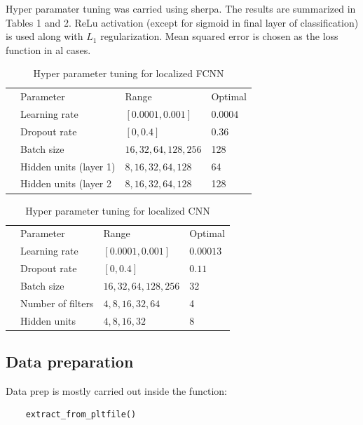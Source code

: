 \documentclass{article}
\begin{document}
Hyper paramater tuning was carried using sherpa. The results are summarized in Tables 1 and 2.  ReLu activation (except for sigmoid in final layer of classification) is used along with $L_1$ regularization. Mean squared error is chosen as the loss function in al cases.

\begin{table}
\centering
\begin{tabular}{llll}
 &Parameter  &Range   &Optimal    \\
 &Learning rate  &$[0.0001,0.001]$  &$0.0004$  \\
 &Dropout rate   &$[0,0.4]$  &$0.36$  \\
 &Batch size &${16,32,64,128,256}$  &128  \\
 &Hidden units (layer 1) & ${8,16,32,64,128}$  &64 \\
 &Hidden units (layer 2 & ${8,16,32,64,128}$  &128 \\
\end{tabular}
 \caption{Hyper parameter tuning for localized FCNN}
\end{table}

\begin{table}
\centering
\begin{tabular}{llll}
 &Parameter  &Range   &Optimal    \\
 &Learning rate  &$[0.0001,0.001]$  &$0.00013$  \\
 &Dropout rate   &$[0,0.4]$  &$0.11$  \\
 &Batch size &${16,32,64, 128,256}$  &32  \\
 &Number of filters & ${4,8,16,32,64}$  &4 \\
 &Hidden units & ${4,8,16,32}$  &8 \\
\end{tabular}
\caption{Hyper parameter tuning for localized CNN}
\end{table}

\subsection{Data preparation}
Data prep is mostly carried out inside the function:
\begin{verbatim}
    extract_from_pltfile()
\end{verbatim}
\end{document}

